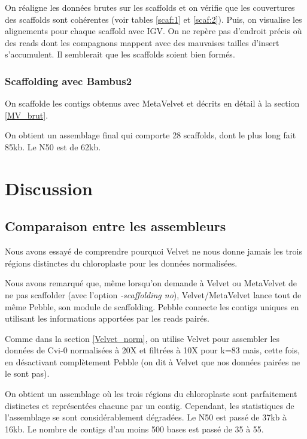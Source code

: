 \documentclass[a4paper]{article}
\begin{document}
On réaligne les données brutes sur les scaffolds et on vérifie que les couvertures des scaffolds sont cohérentes (voir tables \ref{scaf:1} et \ref{scaf:2}). Puis, on visualise les alignements pour chaque scaffold avec IGV. On ne repère pas d'endroit précis où des reads dont les compagnons mappent avec des mauvaises tailles d'insert s'accumulent. Il semblerait que les scaffolds soient bien formés. 


\subsubsection{Scaffolding avec Bambus2}

On scaffolde les contigs obtenus avec MetaVelvet et décrits en détail à la section \ref{MV_brut}.

On obtient un assemblage final qui comporte 28 scaffolds, dont le plus long fait 85kb. Le N50 est de 62kb. 

 
\section{Discussion}

\subsection{Comparaison entre les assembleurs}

Nous avons essayé de comprendre pourquoi Velvet ne nous donne jamais les trois régions distinctes du chloroplaste pour les données normalisées. 

Nous avons remarqué que, même lorsqu'on demande à Velvet ou MetaVelvet de ne pas scaffolder (avec l'option \textit{-scaffolding no}), Velvet/MetaVelvet lance tout de même Pebble, son module de scaffolding. Pebble connecte les contigs uniques en utilisant les informations apportées par les reads pairés. 

Comme dans la section \ref{Velvet_norm}, on utilise Velvet pour assembler les données de Cvi-0 normalisées à 20X et filtrées à 10X pour k=83 mais, cette fois,  en désactivant complètement Pebble (on dit à Velvet que nos données pairées ne le sont pas). 

On obtient un assemblage où les trois régions du chloroplaste sont parfaitement distinctes et représentées chacune par un contig. Cependant, les statistiques de l'assemblage se sont considérablement dégradées. Le N50 est passé de 37kb à 16kb. Le nombre de contigs d'au moins 500 bases est passé de 35 à 55. 
\end{document}
